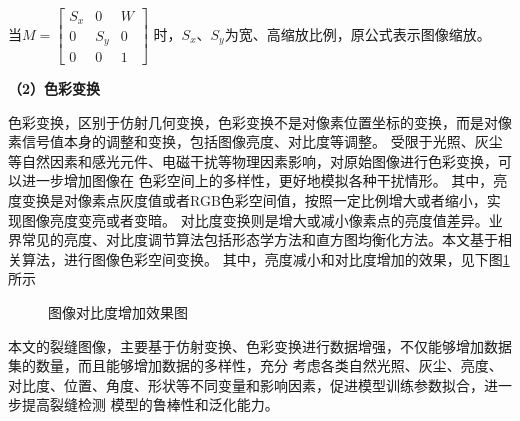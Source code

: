 当$M=\begin{bmatrix}
     S_x & 0 & W \\
	 0 & S_y & 0 \\
	 0 & 0 & 1 
\end{bmatrix}$
时，$S_x$、$S_y$为宽、高缩放比例，原公式表示图像缩放。

\textbf{（2）色彩变换}

色彩变换，区别于仿射几何变换，色彩变换不是对像素位置坐标的变换，而是对像素信号值本身的调整和变换，包括图像亮度、对比度等调整。
受限于光照、灰尘等自然因素和感光元件、电磁干扰等物理因素影响，对原始图像进行色彩变换，可以进一步增加图像在
色彩空间上的多样性，更好地模拟各种干扰情形。
其中，亮度变换是对像素点灰度值或者RGB色彩空间值，按照一定比例增大或者缩小，实现图像亮度变亮或者变暗。
对比度变换则是增大或减小像素点的亮度值差异。业界常见的亮度、对比度调节算法包括形态学方法和直方图均衡化方法。本文基于相关算法，进行图像色彩空间变换。
其中，亮度减小和对比度增加的效果，见下图\ref{contrast-test}所示

\begin{figure}[H]
	\caption{图像对比度增加效果图}
	\label{contrast-test}
\end{figure}

本文的裂缝图像，主要基于仿射变换、色彩变换进行数据增强，不仅能够增加数据集的数量，而且能够增加数据的多样性，充分
考虑各类自然光照、灰尘、亮度、对比度、位置、角度、形状等不同变量和影响因素，促进模型训练参数拟合，进一步提高裂缝检测
模型的鲁棒性和泛化能力。


